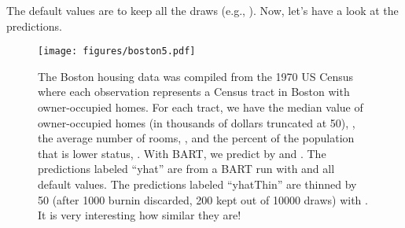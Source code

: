 \documentclass[article]{jss}
\begin{document}


The default values are to keep all the draws (e.g.,
).
Now, let's have a look at the predictions.
\begin{figure}
\begin{center}
\texttt{[image: figures/boston5.pdf]}
\end{center}
\caption{\label{boston5}The Boston housing data was compiled from the
  1970 US Census where each observation represents a Census tract in
  Boston with owner-occupied homes. For each tract, we have the median
  value of owner-occupied homes (in thousands of dollars truncated at
  50), , the average number of rooms, , and the
  percent of the population that is lower status, .  With
  BART, we predict  by  and .  The
  predictions labeled ``yhat'' are from a BART run with 
  and all default values.  The predictions labeled ``yhatThin'' are
  thinned by 50 (after 1000 burnin discarded, 200 kept out of 10000
  draws) with .  It is very interesting how similar they
  are!  }
\end{figure}
\end{document}

